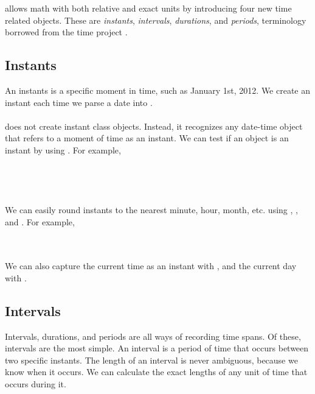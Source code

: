\documentclass[article]{jss}
\begin{document}
 allows math with both relative and exact units by introducing four new time related objects. These are \emph{instants}, \emph{intervals}, \emph{durations}, and \emph{periods}, terminology borrowed from the  time project \citep{jodatime}. 

\subsection{Instants}
\label{sec:instants}

An instants is a specific moment in time, such as January 1st, 2012. We create an instant each time we parse a date into . \\

\\

 does not create instant class objects. Instead, it recognizes any date-time object that refers to a moment of time as an instant. We can test if an object is an instant by using . For example,\\

\\
\\

\\
\\

We can easily round instants to the nearest minute, hour, month, etc. using , , and . For example,

\\
\\

We can also capture the current time as an instant with , and the current day with .



\subsection{Intervals}
\label{sec:intervals}

Intervals, durations, and periods are all ways of recording time spans. Of these, intervals are the most simple. An interval is a period of time that occurs between two specific instants. The length of an interval is never ambiguous, because we know when it occurs. We can calculate the exact lengths of any unit of time that occurs during it. 
\end{document}
